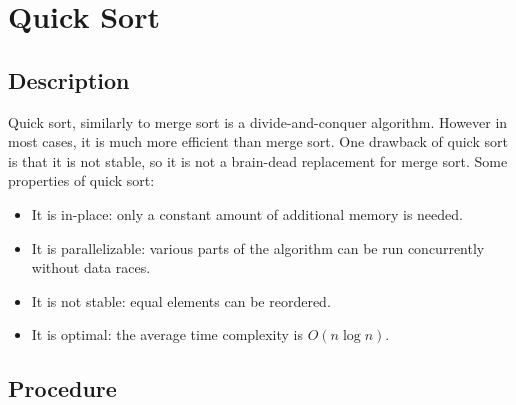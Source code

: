 \section{Quick Sort}

\subsection{Description}

Quick sort, similarly to merge sort is a divide-and-conquer algorithm. However in most cases, it is much more efficient than merge sort. One drawback of quick sort is that it is not stable, so it is not a brain-dead replacement for merge sort. Some properties of quick sort:
\begin{itemize}
    \item It is in-place: only a constant amount of additional memory is needed.
    \item It is parallelizable: various parts of the algorithm can be run concurrently without data races.
    \item It is not stable: equal elements can be reordered.
    \item It is optimal: the average time complexity is $O(n \log n)$.
\end{itemize}

\subsection{Procedure}


